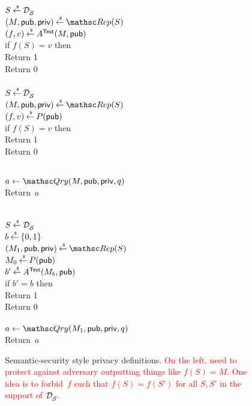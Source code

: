 %
\begin{figure}[htbp]
\centering
{}
{
{

\\
$S\getsr \distr{\calS}{}$\\
$(M,\pubaux,\privaux) \getsr \Rep(S)$\\
$(f,v) \getsr A^{\TestOracle}(M,\pubaux)$\\
if $f(S)=v$ then\\
\nudge Return 1\\
Return 0\\

\medskip
{}\\
$S\getsr \distr{\calS}{}$\\
$(M,\pubaux,\privaux) \getsr \Rep(S)$\\
$(f,v) \getsr P(\pubaux)$\\
if $f(S)=v$ then\\
\nudge Return 1\\
Return 0\\
}
%
{
\\
$a \gets \Qry(M,\pubaux,\privaux,q)$\\
Return~$a$\\
}
}
{
{
\\
$S\getsr \distr{\calS}{}$\\
$b \getsr \bits$\\
$(M_1,\pubaux,\privaux) \getsr \Rep(S)$\\
$M_0 \getsr P(\pubaux)$\\
$b' \getsr A^{\TestOracle}(M_b,\pubaux)$\\
if $b'=b$ then\\
\nudge Return 1\\
Return 0\\
%
}
%
{
\\
$a \gets \Qry(M_1,\pubaux,\privaux,q)$\\
Return~$a$\\
}
}
\caption{Semantic-security style privacy
  definitions. \textcolor{red}{On the left, need to protect against
    adversary outputting
    things like $f(S)=M$.  One idea is to forbid~$f$ such that
    $f(S)=f(S')$ for all $S,S'$ in the support of $\distr{\calS}{}$.}
    } 
\label{fig:privacy-ss}
\end{figure}
